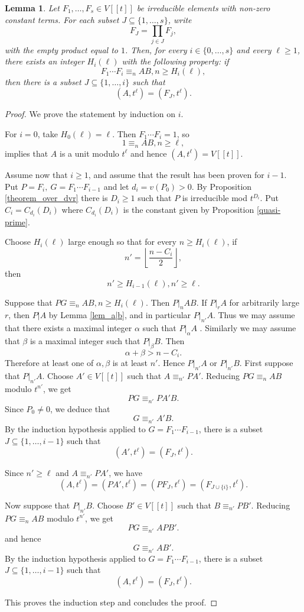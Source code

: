 \documentclass{article}
\theoremstyle{plain}
\newtheorem{lemma}[theorem]{Lemma}
\theoremstyle{definition}
\theoremstyle{remark}
\theoremstyle{plain}
\begin{document}
\begin{lemma}
Let $F_1,\ldots,F_s\in V[[t]]$  
be irreducible elements with non-zero constant terms. For each subset
$J\subseteq \{1,\ldots,s\}$, write
$$
F_J=\prod_{j\in J}F_j,
$$
with the empty product equal to $1$. Then, for every
$i\in\{0,\ldots,s\}$ and every $\ell \geq 1$, there exists an integer
$H_i(\ell)$ with the following property: if
$$
F_1\cdots F_i\equiv_n AB, n\ge H_i(\ell),
$$
then there is a subset $J\subseteq \{1,\ldots,i\}$ such that
$$
(A,t^\ell)=(F_J,t^\ell).
$$
\end{lemma}

\begin{proof}
We prove the statement by induction on $i$.

For $i=0$, take $H_0(\ell)=\ell$. Then $F_1\cdots F_i=1$, so 
$$
1\equiv_n AB, n\ge \ell,
$$
implies that $A$ is a unit modulo $t^\ell$ and hence
$(A,t^\ell)=V[[t]]$. 


Assume now that $i\ge 1$, and assume that the result has been proven for $i-1$. Put
$P=F_i,\ G=F_1\cdots F_{i-1}$ and let 
$
d_i=v(P_0)>0.
$
By Proposition \ref{theorem_over_dvr} there is $D_i\ge 1$ such that $P$ is irreducible mod $t^{D_i}$. Put $C_i=C_{d_i}(D_i)$
where $C_{d_i}(D_i)$ is the constant given by Proposition \ref{quasi-prime}. 

Choose $H_i(\ell)$ large enough so that for every $n\ge H_i(\ell)$, if
$$
n'=\left\lfloor \frac{n-C_i}{2}\right\rfloor,
$$
then
$$
n'\geq H_{i-1}(\ell),
n'\geq \ell.
$$


Suppose that $PG\equiv_n AB, n\ge H_i(\ell)$. 
Then $P|_n AB$. If $P|_r A$ for arbitrarily large $r$, then $P|A$ by Lemma \ref{lem_a|b}, and in particular $P|_{n'} A$. Thus we may assume that there exists a maximal integer $\alpha$ such that $P |_\alpha A$ . Similarly we may assume that $\beta$ is a maximal integer such that $P|_\beta B$. Then $$
\alpha+\beta>n-C_i.
$$
Therefore at least one of $\alpha,\beta$ is at least $n'$. Hence
$P |_{n'} A$ or $P|_{n'} B.$ First suppose that $P|_{n'}A$. Choose $A'\in V[[t]]$ such that $A \equiv_{n'} PA'$. Reducing $PG\equiv_n AB$ modulo $t^{n'}$, we get
$$
PG\equiv_{n'} PA'B.
$$
Since $P_0\neq 0$, we deduce that
$$
G\equiv_{n'} A'B.
$$
By the induction hypothesis applied to $G=F_1\cdots F_{i-1}$, there is a subset $J\subseteq \{1,\ldots,i-1\}$ such that
$$
(A',t^\ell)=(F_J,t^\ell).
$$

Since $n'\ge \ell$ and $A\equiv_{n'}PA'$, we have
$$
(A,t^\ell) =(PA',t^\ell) =
(PF_J,t^\ell) = (F_{J\cup\{i\}},t^\ell).
$$

Now suppose that $P|_{n'}B$. Choose $B'\in V[[t]]$ such that
$B\equiv_{n'}PB'$. Reducing $PG\equiv_n AB$ modulo $t^{n'}$, we get
$$
PG\equiv_{n'} APB'.
$$
and hence
$$
G\equiv_{n'} AB'.
$$
By the induction hypothesis applied to $G=F_1\cdots F_{i-1}$, there is a subset $J\subseteq \{1,\ldots,i-1\}$ such that
$$
(A,t^\ell)=(F_J,t^\ell).
$$

This proves the induction step and concludes the proof.
\end{proof}
\end{document}
